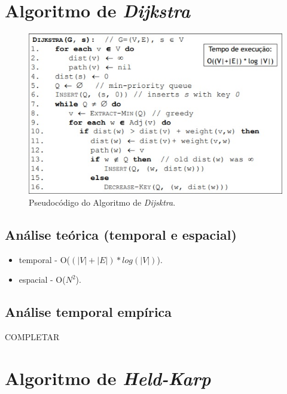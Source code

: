 \documentclass[article, a4paper, 12pt, oneside]{memoir}
\begin{document}
\section{Algoritmo de \textit{Dijkstra}}

\begin{figure}[h!]
  \centerline{\includegraphics[scale=1]{Dijkstra_pseudocode.jpg}}
  \caption{Pseudocódigo do Algoritmo de \textit{Dijsktra}.}
\end{figure}

\subsection{Análise teórica (temporal e espacial)}

\begin{itemize}
	\item temporal -  O($(|V| + |E|)*log(|V|)$).
	\item espacial - O($N^2$).
\end{itemize}

\subsection{Análise temporal empírica }

{\Large COMPLETAR}

\section{Algoritmo de \textit{Held-Karp}}
\end{document}
